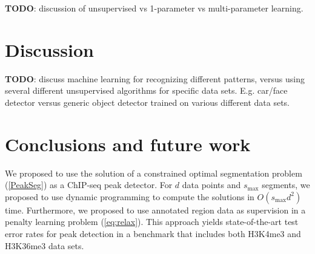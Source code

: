 \documentclass{article}
\begin{document}
\textbf{TODO}: discussion of unsupervised vs 1-parameter vs multi-parameter
learning.

%   

\section{Discussion}
\label{sec:discussion}

\textbf{TODO}: discuss machine learning for recognizing different
patterns, versus using several different unsupervised algorithms for
specific data sets. E.g. car/face detector versus generic object
detector trained on various different data sets.



\section{Conclusions and future work}
\label{sec:conclusions}

We proposed to use the solution of a constrained optimal segmentation
problem (\ref{PeakSeg}) as a ChIP-seq peak detector. For
$d$ data points and $s_{\text{max}}$ segments, we proposed to use
dynamic programming to compute the solutions in $O(s_{\text{max}} d^2)$
time. Furthermore, we proposed to use annotated region data as
supervision in a penalty learning problem (\ref{eq:relax}). This
approach yields state-of-the-art test error rates for peak detection
in a benchmark that includes both H3K4me3 and H3K36me3 data
sets.
\end{document}
